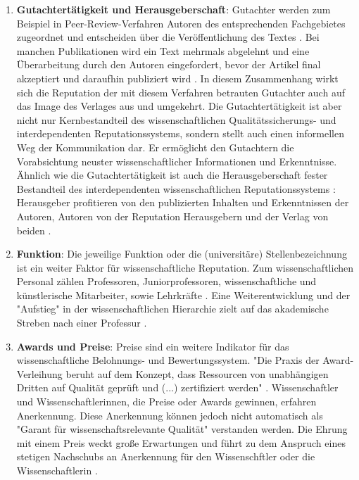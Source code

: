 \begin{enumerate}
\item \textbf{Gutachtertätigkeit und Herausgeberschaft}: Gutachter werden zum Beispiel in Peer-Review-Verfahren Autoren des entsprechenden Fachgebietes zugeordnet und entscheiden über die Veröffentlichung des Textes \cite{Frey_2005}. Bei manchen Publikationen wird ein Text mehrmals abgelehnt und eine Überarbeitung durch den Autoren eingefordert, bevor der Artikel final akzeptiert und daraufhin publiziert wird \cite{Frey_2005}. In diesem Zusammenhang wirkt sich die Reputation der mit diesem Verfahren betrauten Gutachter auch auf das Image des Verlages aus und umgekehrt. Die Gutachtertätigkeit ist aber nicht nur Kernbestandteil des wissenschaftlichen Qualitätssicherungs- und interdependenten Reputationssystems, sondern stellt auch einen informellen Weg der Kommunikation dar. Er ermöglicht den Gutachtern die Vorabsichtung neuster wissenschaftlicher Informationen und Erkenntnisse. Ähnlich wie die Gutachtertätigkeit ist auch die Herausgeberschaft fester Bestandteil des interdependenten wissenschaftlichen Reputationssystems \cite{Frey_2005}: Herausgeber profitieren von den publizierten Inhalten und Erkenntnissen der Autoren, Autoren von der Reputation Herausgebern und der Verlag von beiden \cite{suchen}.
\item \textbf{Funktion}: Die jeweilige Funktion oder die (universitäre) Stellenbezeichnung ist ein weiter Faktor für wissenschaftliche Reputation. Zum wissenschaftlichen Personal zählen Professoren, Juniorprofessoren, wissenschaftliche und künstlerische Mitarbeiter, sowie Lehrkräfte \cite{erhardt_2011_hochschulen}. Eine Weiterentwicklung und der "Aufstieg" in der wissenschaftlichen Hierarchie zielt auf das akademische Streben nach einer Professur \cite{Klecha_2008}.
\item \textbf{Awards und Preise}: Preise sind ein weitere Indikator für das wissenschaftliche Belohnungs- und Bewertungssystem. "Die Praxis der Award-Verleihung beruht auf dem Konzept, dass Ressourcen von unabhängigen Dritten auf Qualität geprüft und (...) zertifiziert werden" \cite{bargheer_2002_qualitatskriterien}. Wissenschaftler und Wissenschaftlerinnen, die Preise oder Awards gewinnen, erfahren Anerkennung. Diese Anerkennung können jedoch nicht automatisch als "Garant für wissenschaftsrelevante Qualität"\cite{bargheer_2002_qualitatskriterien} verstanden werden. Die Ehrung mit einem Preis weckt große Erwartungen und führt zu dem Anspruch eines stetigen Nachschubs an Anerkennung für den Wissenschftler oder die Wissenschaftlerin \cite{suchen}.
\end{enumerate}


